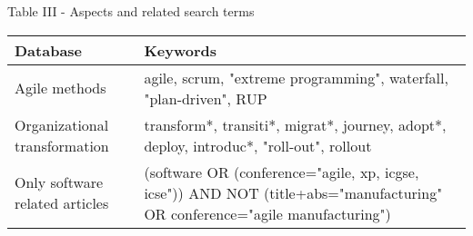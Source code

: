 \centering
Table III - Aspects and related search terms

\begin{tabular}{p{13em} p{30em}}
    \bfseries{Database} & \bfseries{Keywords} \\
    \hline
    Agile methods & agile, scrum, "extreme programming", waterfall, "plan-driven", RUP \\
    Organizational transformation & transform*, transiti*, migrat*, journey, adopt*, deploy, introduc*, "roll-out", rollout \\
    Only software related articles & (software OR (conference="agile, xp, icgse, icse")) AND NOT (title+abs="manufacturing" OR conference="agile manufacturing") \\
    \hline
\end{tabular}

\raggedright
